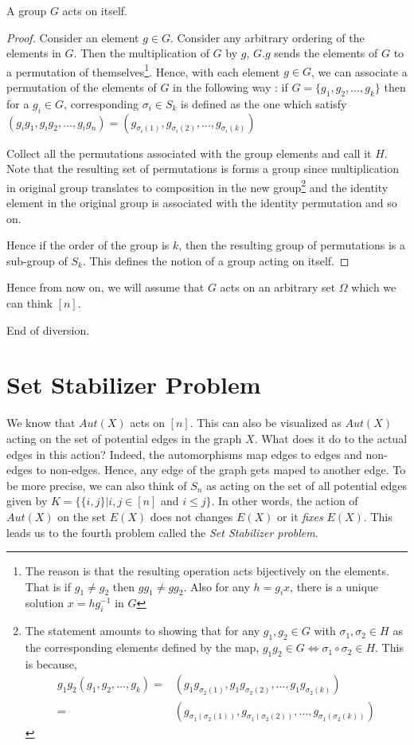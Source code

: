 \begin{claim}
A group $G$ acts on itself.
\end{claim}
\begin{proof}
Consider an element $g \in G$. Consider any arbitrary ordering of the elements in $G$. Then the multiplication of $G$ by $g$, $G.g$ sends the elements of $G$ to a permutation of themselves\footnote{The reason is that the resulting
operation acts bijectively on the elements. That is if $g_1 \ne g_2$ then $gg_1 \ne gg_2$. Also for any $h = g_ix$, there is a unique solution $x = hg_i^{-1}$ in $G$}. Hence, with each element
$g \in G$, we can associate a permutation of the elements of $G$ in the following way : if $G = \{g_1,g_2,\ldots,g_k\}$ then for a $g_i \in G$, corresponding $\sigma_i \in S_k$ is defined as the one which satisfy $(g_ig_1,g_ig_2,\ldots,g_ig_n) = (g_{\sigma_i(1)}, g_{\sigma_i(2)}, \ldots, g_{\sigma_i(k)})$

Collect all the permutations associated with the group elements and call it $H$. Note that the resulting set of permutations is forms a group since multiplication in original group translates to composition in the new group\footnote{ The statement amounts to showing that for any $g_1,g_2 \in G$ with $\sigma_1, \sigma_2 \in H$ as the corresponding elements defined by the map, $g_1g_2 \in G \iff \sigma_1 \circ \sigma_2 \in H$. This is because, \begin{align*}
	g_1g_2 (g_1, g_2, \ldots, g_k) 
	= & (g_1 g_{\sigma_2(1)}, g_1 g_{\sigma_2(2)}, \ldots, 
	g_1 g_{\sigma_2(k)}) \\
	= & (g_{\sigma_1(\sigma_2(1))}, g_{\sigma_1(\sigma_2(2))},
	\ldots, g_{\sigma_1(\sigma_2(k))})
\end{align*}
}
and the identity element in the original group is associated with the identity
permutation and so on.

Hence if the order of the group is $k$, then the resulting group of
permutations is a sub-group of $S_{k}$. This defines the notion of a group acting on itself.
\end{proof}

\begin{note}
Hence from now on, we will assume that $G$ acts on an arbitrary set $\Omega$ which we can think $[n]$.
\end{note}
End of diversion.

\section{Set Stabilizer Problem}
We know that $Aut(X)$ acts on $[n]$. This can also be visualized as $Aut(X)$ acting on the set of potential edges in the graph $X$. What does it do to the actual edges in this action? Indeed, the automorphisms map edges to edges and non-edges to non-edges. Hence, any edge of the graph gets maped to another edge. To be more precise, we can also think of $S_n$ as acting on the set of all potential edges given by 
$K = \{ \{i, j\} | i, j \in [n]$ and $i \le j\}$. In other
words, the action of $Aut(X)$ on the set $E(X)$ does not changes $E(X)$ or it \emph{fixes} $E(X)$. This leads us to the fourth problem called the \emph{Set Stabilizer problem}.

